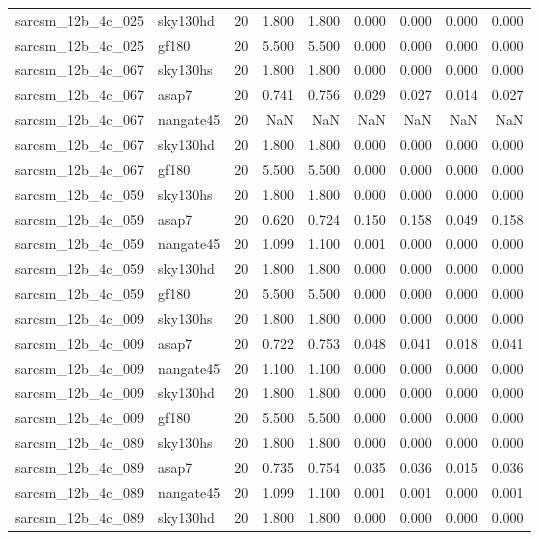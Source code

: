 \begin{tabular}{llrrrrrrr}
sarcsm\_12b\_4c\_025 & sky130hd & 20 & 1.800 & 1.800 & 0.000 & 0.000 & 0.000 & 0.000 \\
sarcsm\_12b\_4c\_025 & gf180 & 20 & 5.500 & 5.500 & 0.000 & 0.000 & 0.000 & 0.000 \\
sarcsm\_12b\_4c\_067 & sky130hs & 20 & 1.800 & 1.800 & 0.000 & 0.000 & 0.000 & 0.000 \\
sarcsm\_12b\_4c\_067 & asap7 & 20 & 0.741 & 0.756 & 0.029 & 0.027 & 0.014 & 0.027 \\
sarcsm\_12b\_4c\_067 & nangate45 & 20 & NaN & NaN & NaN & NaN & NaN & NaN \\
sarcsm\_12b\_4c\_067 & sky130hd & 20 & 1.800 & 1.800 & 0.000 & 0.000 & 0.000 & 0.000 \\
sarcsm\_12b\_4c\_067 & gf180 & 20 & 5.500 & 5.500 & 0.000 & 0.000 & 0.000 & 0.000 \\
sarcsm\_12b\_4c\_059 & sky130hs & 20 & 1.800 & 1.800 & 0.000 & 0.000 & 0.000 & 0.000 \\
sarcsm\_12b\_4c\_059 & asap7 & 20 & 0.620 & 0.724 & 0.150 & 0.158 & 0.049 & 0.158 \\
sarcsm\_12b\_4c\_059 & nangate45 & 20 & 1.099 & 1.100 & 0.001 & 0.000 & 0.000 & 0.000 \\
sarcsm\_12b\_4c\_059 & sky130hd & 20 & 1.800 & 1.800 & 0.000 & 0.000 & 0.000 & 0.000 \\
sarcsm\_12b\_4c\_059 & gf180 & 20 & 5.500 & 5.500 & 0.000 & 0.000 & 0.000 & 0.000 \\
sarcsm\_12b\_4c\_009 & sky130hs & 20 & 1.800 & 1.800 & 0.000 & 0.000 & 0.000 & 0.000 \\
sarcsm\_12b\_4c\_009 & asap7 & 20 & 0.722 & 0.753 & 0.048 & 0.041 & 0.018 & 0.041 \\
sarcsm\_12b\_4c\_009 & nangate45 & 20 & 1.100 & 1.100 & 0.000 & 0.000 & 0.000 & 0.000 \\
sarcsm\_12b\_4c\_009 & sky130hd & 20 & 1.800 & 1.800 & 0.000 & 0.000 & 0.000 & 0.000 \\
sarcsm\_12b\_4c\_009 & gf180 & 20 & 5.500 & 5.500 & 0.000 & 0.000 & 0.000 & 0.000 \\
sarcsm\_12b\_4c\_089 & sky130hs & 20 & 1.800 & 1.800 & 0.000 & 0.000 & 0.000 & 0.000 \\
sarcsm\_12b\_4c\_089 & asap7 & 20 & 0.735 & 0.754 & 0.035 & 0.036 & 0.015 & 0.036 \\
sarcsm\_12b\_4c\_089 & nangate45 & 20 & 1.099 & 1.100 & 0.001 & 0.001 & 0.000 & 0.001 \\
sarcsm\_12b\_4c\_089 & sky130hd & 20 & 1.800 & 1.800 & 0.000 & 0.000 & 0.000 & 0.000 \\

\end{tabular}
